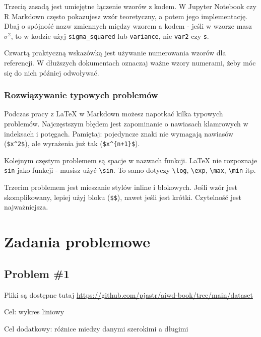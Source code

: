 \documentclass[
  polish,
  letterpaper,
  DIV=11,
  numbers=noendperiod]{scrreprt}
\begin{document}
Trzecią zasadą jest umiejętne łączenie wzorów z kodem. W Jupyter
Notebook czy R Markdown często pokazujesz wzór teoretyczny, a potem jego
implementację. Dbaj o spójność nazw zmiennych między wzorem a kodem -
jeśli w wzorze masz \(\sigma^2\), to w kodzie użyj
\texttt{sigma\_squared} lub \texttt{variance}, nie \texttt{var2} czy
\texttt{s}.

Czwartą praktyczną wskazówką jest używanie numerowania wzorów dla
referencji. W dłuższych dokumentach oznaczaj ważne wzory numerami, żeby
móc się do nich później odwoływać.

\section{Rozwiązywanie typowych
problemów}\label{rozwiux105zywanie-typowych-problemuxf3w}

Podczas pracy z LaTeX w Markdown możesz napotkać kilka typowych
problemów. Najczęstszym błędem jest zapominanie o nawiasach klamrowych w
indeksach i potęgach. Pamiętaj: pojedyncze znaki nie wymagają nawiasów
(\texttt{\$x\^{}2\$}), ale wyrażenia już tak
(\texttt{\$x\^{}\{n+1\}\$}).

Kolejnym częstym problemem są spacje w nazwach funkcji. LaTeX nie
rozpoznaje \texttt{sin} jako funkcji - musisz użyć
\texttt{\textbackslash{}sin}. To samo dotyczy
\texttt{\textbackslash{}log}, \texttt{\textbackslash{}exp},
\texttt{\textbackslash{}max}, \texttt{\textbackslash{}min} itp.

Trzecim problemem jest mieszanie stylów inline i blokowych. Jeśli wzór
jest skomplikowany, lepiej użyj bloku (\texttt{\$\$}), nawet jeśli jest
krótki. Czytelność jest najważniejsza.

\part{Zadania problemowe}

\chapter{Problem \#1}\label{problem-1}

Pliki są dostępne tutaj
\url{https://github.com/pjastr/aiwd-book/tree/main/dataset}

Cel: wykres liniowy

Cel dodatkowy: różnice miedzy danymi szerokimi a długimi
\end{document}
